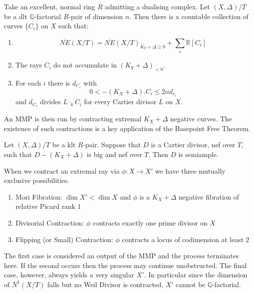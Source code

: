 \documentclass[a4paper,12pt]{book}
\begin{document}
\begin{conjecture}\label{cone-conj}
	Take an excellent, normal ring $R$ admitting a dualising complex.
	Let $(X,\Delta)/T$ be a dlt $\mathbb{Q}$-factorial $R$-pair of dimension $n$. Then there is a countable collection of curves $\{C_{i}\}$ on $X$ such that:
	\begin{enumerate}
		\item $$\overline{NE}(X/T)=\overline{NE}(X/T)_{K_{Y}+\Delta \geq 0} + \sum_{i} \mathbb{R}[C_{i}]$$
		\item The rays $C_{i}$ do not accumulate in $(K_{Y}+\Delta)_{<0}$.
		\item For each $i$ there is $d_{C_{i}}$ with 
		\[0 < -(K_{X}+\Delta).C_{i} \leq 2nd_{c_{i}}\]
		and $d_{C_{i}}$ divides $L\cdot_{k}C_{i}$ for every Cartier divisor $L$ on $X$.
	\end{enumerate}
\end{conjecture}

An MMP is then run by contracting extremal $K_{X}+\Delta$ negative curves. The existence of such contractions is a key application of the Basepoint Free Theorem.

\begin{conjecture}\label{bpt-conj}
	Let $(X,\Delta)/T$ be a klt $R$-pair. Suppose that $D$ is a Cartier divisor, nef over $T$, such that $D-(K_{X}+\Delta)$ is big and nef over $T$. Then $D$ is semiample.
\end{conjecture}

When we contract an extremal ray via $\phi:X \to X'$ we have three mutually exclusive possibilities.

\begin{enumerate}
	\item Mori Fibration: $\dim X' < \dim X$ and $\phi$ is a $K_{X}+\Delta$ negative fibration of relative Picard rank $1$
	\item Divisorial Contraction: $\phi$ contracts exactly one prime divisor on $X$
	\item Flipping (or Small) Contraction: $\phi$ contracts a locus of codimension at least $2$
\end{enumerate}

The first case is considered an output of the MMP and the process terminates here. If the second occurs then the process may continue unobstructed. The final case, however, always yields a very singular $X'$. In particular since the dimension of $N^{1}(X/T)$ falls but no Weil Divisor is contracted, $X'$ cannot be $\mathbb{Q}$-factorial.
\end{document}
